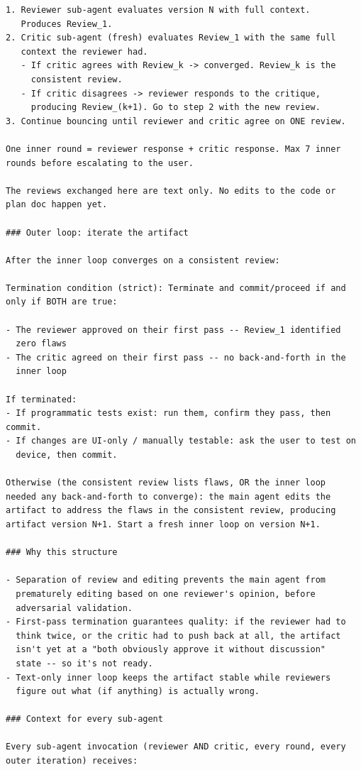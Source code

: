 \documentclass{article}
\begin{document}
\begin{footnotesize}
\begin{verbatim}
1. Reviewer sub-agent evaluates version N with full context.
   Produces Review_1.
2. Critic sub-agent (fresh) evaluates Review_1 with the same full
   context the reviewer had.
   - If critic agrees with Review_k -> converged. Review_k is the
     consistent review.
   - If critic disagrees -> reviewer responds to the critique,
     producing Review_(k+1). Go to step 2 with the new review.
3. Continue bouncing until reviewer and critic agree on ONE review.

One inner round = reviewer response + critic response. Max 7 inner
rounds before escalating to the user.

The reviews exchanged here are text only. No edits to the code or
plan doc happen yet.

### Outer loop: iterate the artifact

After the inner loop converges on a consistent review:

Termination condition (strict): Terminate and commit/proceed if and
only if BOTH are true:

- The reviewer approved on their first pass -- Review_1 identified
  zero flaws
- The critic agreed on their first pass -- no back-and-forth in the
  inner loop

If terminated:
- If programmatic tests exist: run them, confirm they pass, then commit.
- If changes are UI-only / manually testable: ask the user to test on
  device, then commit.

Otherwise (the consistent review lists flaws, OR the inner loop
needed any back-and-forth to converge): the main agent edits the
artifact to address the flaws in the consistent review, producing
artifact version N+1. Start a fresh inner loop on version N+1.

### Why this structure

- Separation of review and editing prevents the main agent from
  prematurely editing based on one reviewer's opinion, before
  adversarial validation.
- First-pass termination guarantees quality: if the reviewer had to
  think twice, or the critic had to push back at all, the artifact
  isn't yet at a "both obviously approve it without discussion"
  state -- so it's not ready.
- Text-only inner loop keeps the artifact stable while reviewers
  figure out what (if anything) is actually wrong.

### Context for every sub-agent

Every sub-agent invocation (reviewer AND critic, every round, every
outer iteration) receives:


\end{verbatim}
\end{footnotesize}
\end{document}
